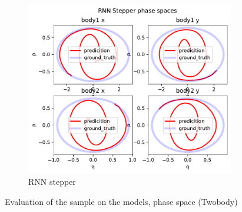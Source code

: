 \begin{figure}[H]
\begin{subfigure}[b]{0.3\textwidth}
		\centering
		\includegraphics[width=\textwidth]{chapters/chapter5/body2_rne_ps.pdf}
		\caption{RNN stepper}
	\end{subfigure}
	
	\caption{Evaluation of the sample on the models, phase space (Twobody)}
	\label{body2_ps}
\end{figure}



